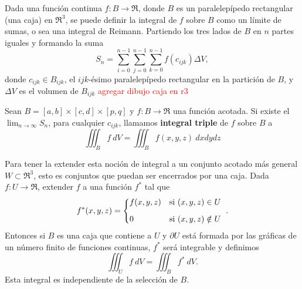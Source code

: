 Dada una funci\'on continua $f:B\to\Re$, donde $B$ es un paralelep\'ipedo rectangular (una caja) en $\Re^3$, se puede definir la integral de $f$ sobre $B$ como un l\'imite de sumas, o sea una integral de Reimann. Partiendo los tres lados de $B$ en $n$ partes iguales y formando la suma
\[
    S_n=\sum_{i=0}^{n-1}\sum_{j=0}^{n-1}\sum_{k=0}^{n-1}f(c_{ijk})\Delta V,
\]  
donde $c_{ijk}\in B_{ijk}$, el $ijk$-\'esimo paralelep\'ipedo rectangular en la partici\'on de $B$, y $\Delta V$ es el volumen de $B_{ijk}$
\textcolor{red}{agregar dibujo caja en r3}

\begin{definition} 
    Sean $B=[a,b]\times[c,d]\times[p,q]$ y $f:B\to\Re$ una funci\'on acotada. Si existe el $\lim_{n\to\infty}S_n$, para cualquier $c_{ijk}$, llamamos \textbf{integral triple} de $f$ sobre $B$ a
    \[
          \iiint_B f\:dV=\iiint_B f(x,y,z)\:dxdydz
    \]
\end{definition}

Para tener la extender esta noci\'on de integral a un conjunto acotado m\'as general $W\subset\Re^3$, esto es conjuntos que puedan ser encerrados por una caja. Dada $f:U\to\Re$, extender $f$ a una funci\'on $f^*$ tal que
\[
    f^*(x,y,z)=
    \begin{dcases*}
        f(x,y,z) & si $(x,y,z)\in U$ \\[.2cm]
        0        & si $(x,y,z)\notin U$
    \end{dcases*}.
\]
Entonces si $B$ es una caja que contiene a $U$ y $\partial U$ est\'a formada por las gr\'aficas de un n\'umero finito de funciones continuas, %
$f^*$ ser\'a integrable y definimos
\[
    \iiint_U f\:dV=\iiint_B f^*\:dV.  
\]
Esta integral es independiente de la selecci\'on de $B$.

